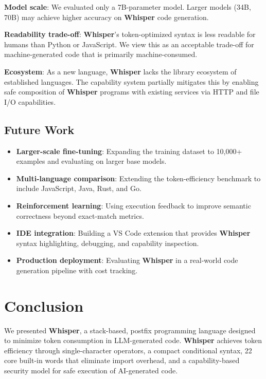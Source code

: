 \documentclass[11pt,a4paper]{article}
\begin{document}
\textbf{Model scale}: We evaluated only a 7B-parameter model. Larger models
(34B, 70B) may achieve higher accuracy on \textbf{Whisper} code generation.

\textbf{Readability trade-off}: \textbf{Whisper}'s token-optimized syntax is
less readable for humans than Python or JavaScript. We view this as an
acceptable trade-off for machine-generated code that is primarily
machine-consumed.

\textbf{Ecosystem}: As a new language, \textbf{Whisper} lacks the library
ecosystem of established languages. The capability system partially mitigates
this by enabling safe composition of \textbf{Whisper} programs with existing
services via HTTP and file I/O capabilities.

\subsection{Future Work}

\begin{itemize}
\item \textbf{Larger-scale fine-tuning}: Expanding the training dataset to
  10,000+ examples and evaluating on larger base models.
\item \textbf{Multi-language comparison}: Extending the token-efficiency
  benchmark to include JavaScript, Java, Rust, and Go.
\item \textbf{Reinforcement learning}: Using execution feedback to improve
  semantic correctness beyond exact-match metrics.
\item \textbf{IDE integration}: Building a VS Code extension that provides
  \textbf{Whisper} syntax highlighting, debugging, and capability inspection.
\item \textbf{Production deployment}: Evaluating \textbf{Whisper} in a
  real-world code generation pipeline with cost tracking.
\end{itemize}

\section{Conclusion}
\label{sec:conclusion}

We presented \textbf{Whisper}, a stack-based, postfix programming language
designed to minimize token consumption in LLM-generated code.
\textbf{Whisper} achieves token efficiency through single-character operators,
a compact conditional syntax, 22 core built-in words that eliminate import
overhead, and a capability-based security model for safe execution of
AI-generated code.
\end{document}
